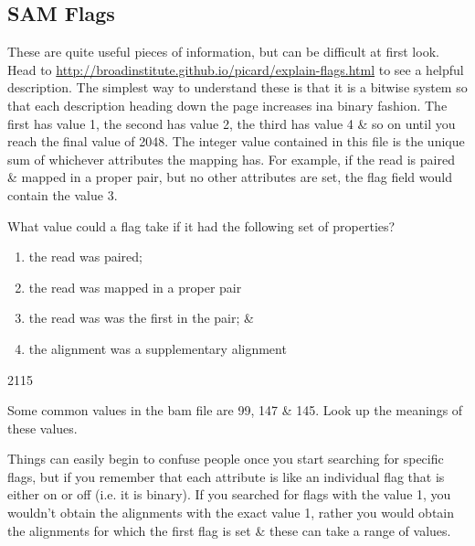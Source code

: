 \subsection{SAM Flags}
\begin{information}
These are quite useful pieces of information, but can be difficult at first look.
Head to \url{http://broadinstitute.github.io/picard/explain-flags.html} to see a helpful description.
The simplest way to understand these is that it is a bitwise system so that each description heading down the page increases ina binary fashion.
The first has value 1, the second has value 2, the third has value 4 \& so on until you reach the final value of 2048.
The integer value contained in this file is the unique sum of whichever attributes the mapping has.
For example, if the read is paired \& mapped in a proper pair, but no other attributes are set, the flag field would contain the value 3.
\end{information}

\begin{questions}
What value could a flag take if it had the following set of properties?
	\begin{enumerate}
	\item the read was paired; 
	\item the read was mapped in a proper pair
	\item the read was was the first in the pair; \& 
	\item the alignment was a supplementary alignment
	\end{enumerate}
\begin{answer}
2115 \\
\end{answer}
Some common values in the bam file are 99, 147 \& 145.
Look up the meanings of these values. \\
\end{questions}

\begin{information}
Things can easily begin to confuse people once you start searching for specific flags, but if you remember that each attribute is like an individual flag that is either on or off (i.e. it is binary).
If you searched for flags with the value 1, you wouldn't obtain the alignments with the exact value 1, rather you would obtain the alignments for which the first flag is set \& these can take a range of values.
\end{information}


